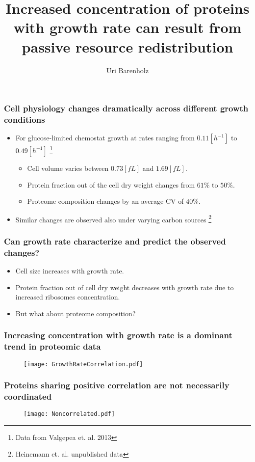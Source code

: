 \documentclass{beamer}
\title{Increased concentration of proteins with growth rate can result from passive resource redistribution}
\author{Uri Barenholz}
\begin{document}
\maketitle
\begin{frame}
\frametitle{Cell physiology changes dramatically across different growth conditions}
\begin{itemize}
\item For glucose-limited chemostat growth at rates ranging from $0.11 [h^{-1}]$ to $0.49 [h^{-1}]$
\footnote{Data from Valgepea et. al. 2013}
\begin{itemize}
\item Cell volume varies between $0.73 [fL]$ and $1.69 [fL]$.
\item Protein fraction out of the cell dry weight changes from $61\%$ to $50\%$.
\item Proteome composition changes by an average CV of $40\%$.
\end{itemize}
\item Similar changes are observed also under varying carbon sources
\footnote{Heinemann et. al. unpublished data}
\end{itemize}
\end{frame}

\begin{frame}
\frametitle{Can growth rate characterize and predict the observed changes?}
\begin{itemize}
\item Cell size increases with growth rate.
\item Protein fraction out of cell dry weight decreases with growth rate due to increased ribosomes concentration.
\item But what about proteome composition?
\end{itemize}
\end{frame}

\begin{frame}
\frametitle{Increasing concentration with growth rate is a dominant trend in proteomic data}
\begin{figure}[h!]
\centering
\texttt{[image: GrowthRateCorrelation.pdf]}
\end{figure}
\end{frame}

\begin{frame}
\frametitle{Proteins sharing positive correlation are not necessarily coordinated}
\begin{figure}[h!]
\centering
\texttt{[image: Noncorrelated.pdf]}
\end{figure}
\end{frame}
\end{document}
